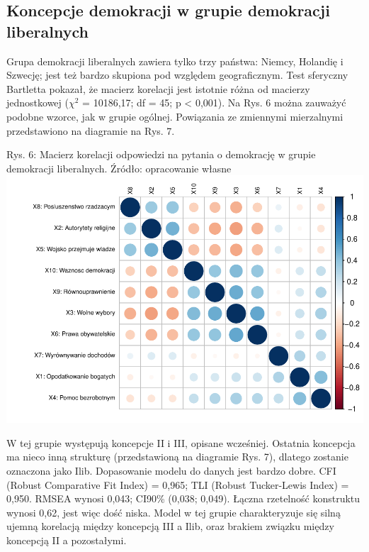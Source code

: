 \documentclass[12pt]{article}
\begin{document}
\hypertarget{koncepcje-demokracji-w-grupie-demokracji-liberalnych}{%
\subsection{Koncepcje demokracji w grupie demokracji liberalnych}\label{koncepcje-demokracji-w-grupie-demokracji-liberalnych}}

Grupa demokracji liberalnych zawiera tylko trzy państwa: Niemcy, Holandię i Szwecję; jest też bardzo skupiona pod względem geograficznym. Test sferyczny Bartletta pokazał, że macierz korelacji jest istotnie różna od macierzy jednostkowej (\(\chi^2\) = 10186,17; df = 45; p \textless{} 0,001). Na Rys. 6 można zauważyć podobne wzorce, jak w grupie ogólnej. Powiązania ze zmiennymi mierzalnymi przedstawiono na diagramie na Rys. 7.

Rys. 6: Macierz korelacji odpowiedzi na pytania o demokrację w grupie demokracji liberalnych. Źródło: opracowanie własne
\includegraphics{text_ASA_files/figure-latex/cor-matrix-lib-1.pdf}

W tej grupie występują koncepcje II i III, opisane wcześniej. Ostatnia koncepcja ma nieco inną strukturę (przedstawioną na diagramie Rys. 7), dlatego zostanie oznaczona jako Ilib. Dopasowanie modelu do danych jest bardzo dobre. CFI (Robust Comparative Fit Index) = 0,965; TLI (Robust Tucker-Lewis Index) = 0,950. RMSEA wynosi 0,043; CI90\% (0,038; 0,049). Łączna rzetelność konstruktu wynosi 0,62, jest więc dość niska. Model w tej grupie charakteryzuje się silną ujemną korelacją między koncepcją III a Ilib, oraz brakiem związku między koncepcją II a pozostałymi.
\end{document}
